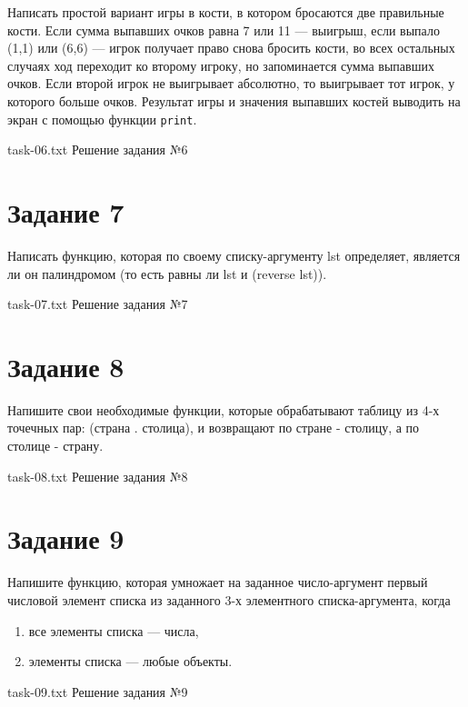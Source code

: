 Написать простой вариант игры в кости, в котором бросаются две правильные кости. Если сумма выпавших очков равна 7 или 11 --- выигрыш, если выпало (1,1) или (6,6) --- игрок получает право снова бросить кости, во всех остальных случаях ход переходит ко второму игроку, но запоминается сумма выпавших очков. Если второй игрок не выигрывает абсолютно, то выигрывает тот игрок, у которого больше очков. Результат игры и значения выпавших костей выводить на экран с помощью функции \texttt{print}.

{task-06.txt} %
{Решение задания №6} %

\section{Задание 7}

Написать функцию, которая по своему списку-аргументу lst определяет, является ли он палиндромом (то есть равны ли lst и (reverse lst)).

{task-07.txt} %
{Решение задания №7} %

\section{Задание 8}

Напишите свои необходимые функции, которые обрабатывают таблицу из 4-х точечных пар: (страна . столица), и возвращают по стране - столицу, а по столице - страну.

{task-08.txt} %
{Решение задания №8} %

\section{Задание 9}

Напишите функцию, которая умножает на заданное число-аргумент первый числовой элемент списка из заданного 3-х элементного списка-аргумента, когда

\begin{enumerate}[label={\alph*)}]
	\item все элементы списка --- числа,
	\item элементы списка --- любые объекты.
\end{enumerate}

\clearpage

{task-09.txt} %
{Решение задания №9} %